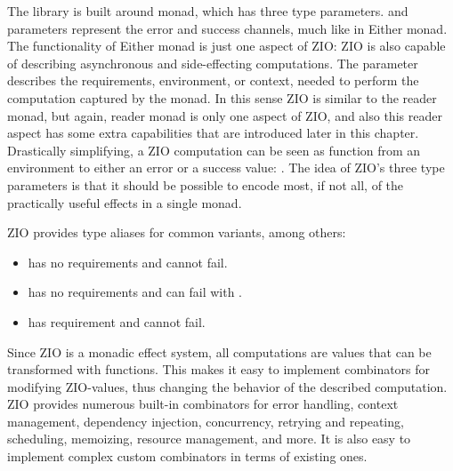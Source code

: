The library is built around  monad, which has three type parameters.  and  parameters represent the error and success channels, much like in Either monad. The functionality of Either monad is just one aspect of ZIO: ZIO is also capable of describing asynchronous and side-effecting computations. The  parameter describes the requirements, environment, or context, needed to perform the computation captured by the monad. In this sense ZIO is similar to the reader monad, but again, reader monad is only one aspect of ZIO, and also this reader aspect has some extra capabilities that are introduced later in this chapter. Drastically simplifying, a ZIO computation can be seen as function from an environment to either an error or a success value: . The idea of ZIO's three type parameters is that it should be possible to encode most, if not all, of the practically useful effects in a single monad. 

ZIO provides type aliases for common variants, among others:
\begin{itemize}
    \item {} has no requirements and cannot fail.
    \item {} has no requirements and can fail with .
    \item {} has requirement  and cannot fail.
\end{itemize}

Since ZIO is a monadic effect system, all computations are values that can be transformed with functions. This makes it easy to implement combinators for modifying ZIO-values, thus changing the behavior of the described computation. ZIO provides numerous built-in combinators for error handling, context management, dependency injection, concurrency, retrying and repeating, scheduling, memoizing, resource management, and more. It is also easy to implement complex custom combinators in terms of existing ones.

